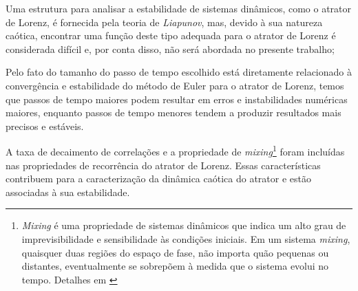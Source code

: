\documentclass[12pt, a4paper]{article}
\begin{document}
Uma estrutura para analisar a estabilidade de sistemas dinâmicos, como o atrator de Lorenz, é fornecida pela teoria de \textit{Liapunov}, mas, devido à sua natureza caótica, encontrar uma função deste tipo adequada para o atrator de Lorenz é considerada difícil e, por conta disso, não será abordada no presente trabalho;

Pelo fato do tamanho do passo de tempo escolhido está diretamente relacionado à convergência e estabilidade do método de Euler para o atrator de Lorenz, temos que passos de tempo maiores podem resultar em erros e instabilidades numéricas maiores, enquanto passos de tempo menores tendem a produzir resultados mais precisos e estáveis.

A taxa de decaimento de correlações e a propriedade de \textit{mixing}\footnote{\textit{Mixing} é uma propriedade de sistemas dinâmicos que indica um alto grau de imprevisibilidade e sensibilidade às condições iniciais. Em um sistema \textit{mixing}, quaisquer duas regiões do espaço de fase, não importa quão pequenas ou distantes, eventualmente se sobrepõem à medida que o sistema evolui no tempo. Detalhes em \cite{Luzzatto2004}} foram incluídas nas propriedades de recorrência do atrator de Lorenz. Essas características contribuem para a caracterização da dinâmica caótica do atrator e estão associadas à sua estabilidade.
\end{document}
